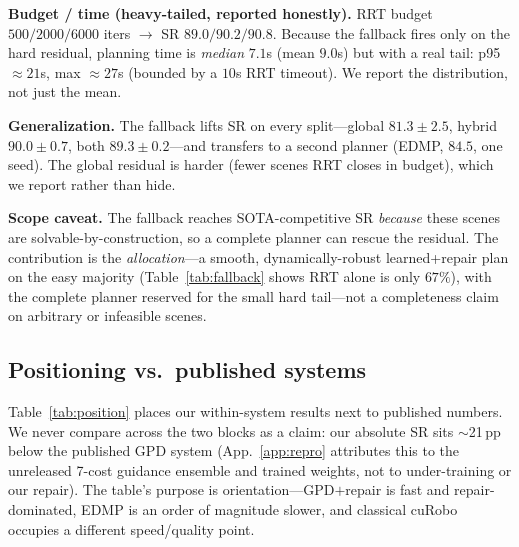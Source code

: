 \documentclass[10pt,twocolumn]{article}
\newcommand{\pp}{\,pp}
\begin{document}
\noindent\textbf{Budget / time (heavy-tailed, reported honestly).} RRT budget
$500/2000/6000$ iters $\to$ SR $89.0/90.2/90.8$. Because the fallback fires only on the
hard residual, planning time is \emph{median} $7.1$s (mean $9.0$s) but with a real tail:
p95 $\approx21$s, max $\approx27$s (bounded by a $10$s RRT timeout). We report the
distribution, not just the mean.

\noindent\textbf{Generalization.} The fallback lifts SR on every split---global $81.3{\pm}2.5$,
hybrid $90.0{\pm}0.7$, both $89.3{\pm}0.2$---and transfers to a second planner (EDMP,
$84.5$, one seed). The global residual is harder (fewer scenes RRT closes in budget), which
we report rather than hide.

\noindent\textbf{Scope caveat.} The fallback reaches SOTA-competitive SR \emph{because}
these scenes are solvable-by-construction, so a complete planner can rescue the residual.
The contribution is the \emph{allocation}---a smooth, dynamically-robust learned+repair plan
on the easy majority (Table~\ref{tab:fallback} shows RRT alone is only $67\%$), with the
complete planner reserved for the small hard tail---not a completeness claim on arbitrary
or infeasible scenes.

\subsection{Positioning vs.\ published systems}
\label{app:positioning}
Table~\ref{tab:position} places our within-system results next to published numbers.
We never compare across the two blocks as a claim: our absolute SR sits $\sim$21\pp{}
below the published GPD system (App.~\ref{app:repro} attributes this to the unreleased
7-cost guidance ensemble and trained weights, not to under-training or our repair). The
table's purpose is orientation---GPD$+$repair is fast and repair-dominated, EDMP is an
order of magnitude slower, and classical cuRobo occupies a different speed/quality point.
\end{document}
